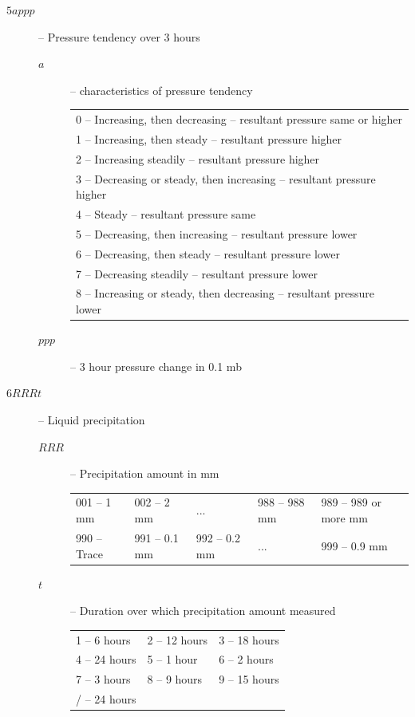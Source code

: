\documentclass{article}
\begin{document}
\begin{description}
\item[$5appp$] -- Pressure tendency over 3 hours
  \begin{description}
  \item[$a$] -- characteristics of pressure tendency
    \begin{tabular}{l}
      0 -- Increasing, then decreasing -- resultant pressure same or higher\\
      1 -- Increasing, then steady -- resultant pressure higher\\
      2 -- Increasing steadily -- resultant pressure higher\\
      3 -- Decreasing or steady, then increasing -- resultant pressure higher\\
      4 -- Steady -- resultant pressure same\\
      5 -- Decreasing, then increasing -- resultant pressure lower\\
      6 -- Decreasing, then steady -- resultant pressure lower\\
      7 -- Decreasing steadily -- resultant pressure lower\\
      8 -- Increasing or steady, then decreasing -- resultant pressure lower\\
    \end{tabular}
  \item[$ppp$] -- 3 hour pressure change in 0.1 mb
  \end{description}
\end{description}
\begin{description}
\item[$6RRRt$] -- Liquid precipitation
  \begin{description}
  \item[$RRR$] -- Precipitation amount in mm

    \begin{tabular}{lllll}
      001 -- 1 mm&002 -- 2 mm&...&988 -- 988 mm&989 -- 989 or more mm\\
      990 -- Trace&991 -- 0.1 mm&992 -- 0.2 mm&...&999 -- 0.9 mm
    \end{tabular}
  \item[$t$] -- Duration over which precipitation amount measured

    \begin{tabular}{lll}
      1 -- 6 hours&2 -- 12 hours&3 -- 18 hours\\
      4 -- 24 hours&5 -- 1 hour& 6 -- 2 hours\\
      7 -- 3 hours&8 -- 9 hours&9 -- 15 hours\\
      / -- 24 hours& &
    \end{tabular}
  \end{description}
\end{description}
\end{document}
